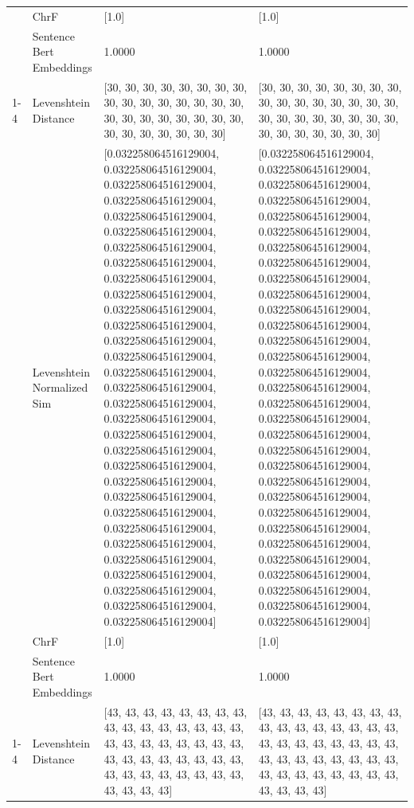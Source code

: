 \begin{tabular}{llll}
 & ChrF & [1.0] & [1.0] \\
 & Sentence Bert Embeddings & 1.0000 & 1.0000 \\
\cline{1-4}
\multirow[t]{4}{*}{Ekeoke nigo gekogendereria oboncho.} & Levenshtein Distance & [30, 30, 30, 30, 30, 30, 30, 30, 30, 30, 30, 30, 30, 30, 30, 30, 30, 30, 30, 30, 30, 30, 30, 30, 30, 30, 30, 30, 30, 30, 30] & [30, 30, 30, 30, 30, 30, 30, 30, 30, 30, 30, 30, 30, 30, 30, 30, 30, 30, 30, 30, 30, 30, 30, 30, 30, 30, 30, 30, 30, 30, 30] \\
 & Levenshtein Normalized Sim & [0.032258064516129004, 0.032258064516129004, 0.032258064516129004, 0.032258064516129004, 0.032258064516129004, 0.032258064516129004, 0.032258064516129004, 0.032258064516129004, 0.032258064516129004, 0.032258064516129004, 0.032258064516129004, 0.032258064516129004, 0.032258064516129004, 0.032258064516129004, 0.032258064516129004, 0.032258064516129004, 0.032258064516129004, 0.032258064516129004, 0.032258064516129004, 0.032258064516129004, 0.032258064516129004, 0.032258064516129004, 0.032258064516129004, 0.032258064516129004, 0.032258064516129004, 0.032258064516129004, 0.032258064516129004, 0.032258064516129004, 0.032258064516129004, 0.032258064516129004, 0.032258064516129004] & [0.032258064516129004, 0.032258064516129004, 0.032258064516129004, 0.032258064516129004, 0.032258064516129004, 0.032258064516129004, 0.032258064516129004, 0.032258064516129004, 0.032258064516129004, 0.032258064516129004, 0.032258064516129004, 0.032258064516129004, 0.032258064516129004, 0.032258064516129004, 0.032258064516129004, 0.032258064516129004, 0.032258064516129004, 0.032258064516129004, 0.032258064516129004, 0.032258064516129004, 0.032258064516129004, 0.032258064516129004, 0.032258064516129004, 0.032258064516129004, 0.032258064516129004, 0.032258064516129004, 0.032258064516129004, 0.032258064516129004, 0.032258064516129004, 0.032258064516129004, 0.032258064516129004] \\
 & ChrF & [1.0] & [1.0] \\
 & Sentence Bert Embeddings & 1.0000 & 1.0000 \\
\cline{1-4}
\multirow[t]{4}{*}{Ritoka nigo rire engencho kera rituko k'omoyo.} & Levenshtein Distance & [43, 43, 43, 43, 43, 43, 43, 43, 43, 43, 43, 43, 43, 43, 43, 43, 43, 43, 43, 43, 43, 43, 43, 43, 43, 43, 43, 43, 43, 43, 43, 43, 43, 43, 43, 43, 43, 43, 43, 43, 43, 43, 43, 43] & [43, 43, 43, 43, 43, 43, 43, 43, 43, 43, 43, 43, 43, 43, 43, 43, 43, 43, 43, 43, 43, 43, 43, 43, 43, 43, 43, 43, 43, 43, 43, 43, 43, 43, 43, 43, 43, 43, 43, 43, 43, 43, 43, 43] \\

\end{tabular}
